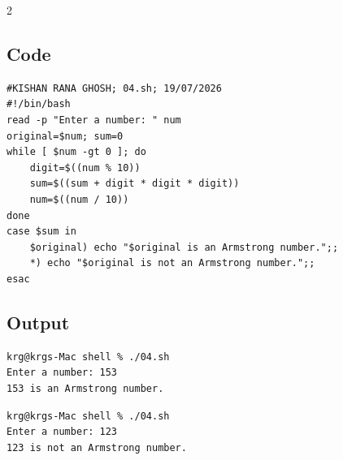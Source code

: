 \documentclass[a4paper,12pt]{article}
\begin{document}
\begin{multicols}{2}
\subsection*{Code}
\begin{lstlisting}[style=bashstyle]
#KISHAN RANA GHOSH; 04.sh; 19/07/2026
#!/bin/bash
read -p "Enter a number: " num
original=$num; sum=0
while [ $num -gt 0 ]; do
    digit=$((num % 10))
    sum=$((sum + digit * digit * digit))
    num=$((num / 10))
done
case $sum in
    $original) echo "$original is an Armstrong number.";;
    *) echo "$original is not an Armstrong number.";;
esac
\end{lstlisting}

\subsection*{Output}
\begin{lstlisting}[style=outputstyle]
krg@krgs-Mac shell % ./04.sh
Enter a number: 153
153 is an Armstrong number.
\end{lstlisting}
\begin{lstlisting}[style=outputstyle]
krg@krgs-Mac shell % ./04.sh
Enter a number: 123
123 is not an Armstrong number.
\end{lstlisting}

\end{multicols}
\newpage
\end{document}
